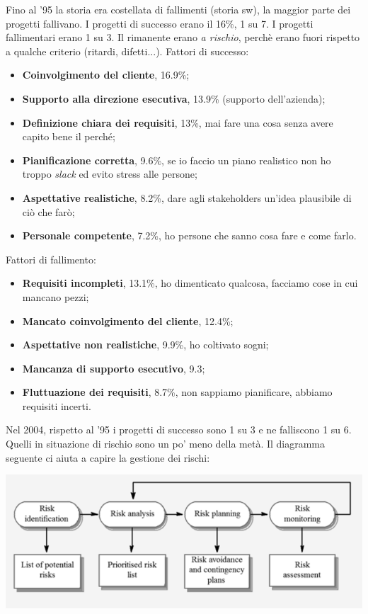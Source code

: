 Fino al '95 la storia era costellata di fallimenti (storia sw), la maggior parte dei progetti fallivano. I progetti di successo erano il 16\%, 1 su 7. I progetti fallimentari erano 1 su 3. Il rimanente erano \textit{a rischio}, perchè erano fuori rispetto a qualche criterio (ritardi, difetti...). Fattori di successo:

\begin{itemize}

	\item \textbf{Coinvolgimento del cliente}, 16.9\%;
	\item \textbf{Supporto alla direzione esecutiva}, 13.9\% (supporto dell'azienda);
	\item \textbf{Definizione chiara dei requisiti}, 13\%, mai fare una cosa senza avere capito bene il perché;
	\item \textbf{Pianificazione corretta}, 9.6\%, se io faccio un piano realistico non ho troppo \textit{slack} ed evito stress alle persone;
	\item \textbf{Aspettative realistiche}, 8.2\%, dare agli stakeholders un'idea plausibile di ciò che farò;
	\item \textbf{Personale competente}, 7.2\%, ho persone che sanno cosa fare e come farlo.

\end{itemize}

Fattori di fallimento:

\begin{itemize}

	\item \textbf{Requisiti incompleti}, 13.1\%, ho dimenticato qualcosa, facciamo cose in cui mancano pezzi;
	\item \textbf{Mancato coinvolgimento del cliente}, 12.4\%;
	\item \textbf{Aspettative non realistiche}, 9.9\%, ho coltivato sogni;
	\item \textbf{Mancanza di supporto esecutivo}, 9.3;
	\item \textbf{Fluttuazione dei requisiti}, 8.7\%, non sappiamo pianificare, abbiamo requisiti incerti.

\end{itemize}

Nel 2004, rispetto al '95 i progetti di successo sono 1 su 3 e ne falliscono 1 su 6. Quelli in situazione di rischio sono un po' meno della metà. Il diagramma seguente ci aiuta a capire la gestione dei rischi:

\begin{center}

\includegraphics[width=0.75\columnwidth]{img1} %

\end{center}

